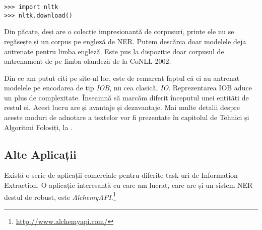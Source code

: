 \lstset{language=python,caption=Python NLTK,label=lst:python-nltk}
\begin{lstlisting}
>>> import nltk
>>> nltk.download()
\end{lstlisting}


Din păcate, deși are o colecție impresionantă de corpusuri, printe ele nu se regăsește și un corpus pe engleză de NER. Putem descărca doar modelele deja antrenate pentru limba engleză. Este pus la dispoziție doar corpusul de antrenament de pe limba olandeză de la CoNLL-2002.

Din ce am putut citi pe site-ul lor, este de remarcat faptul că ei au antrenat modelele pe encodarea de tip \textit{IOB}, nu cea clasică, \textit{IO}. Reprezentarea IOB aduce un plus de complexitate. Înseamnă să marcăm diferit începutul unei entități de restul ei. Acest lucru are și avantaje și dezavantaje. Mai multe detalii despre aceste moduri de adnotare a textelor vor fi prezentate în capitolul de Tehnici și Algoritmi Folosiți, la  .

\subsection{Alte Aplicații}

Există o serie de aplicații comerciale pentru diferite task-uri de Information Extraction. O aplicație interesantă cu care am lucrat, care are și un sistem NER destul de robust, este \textit{AlchemyAPI}.\footnote{\url{http://www.alchemyapi.com/}}


















